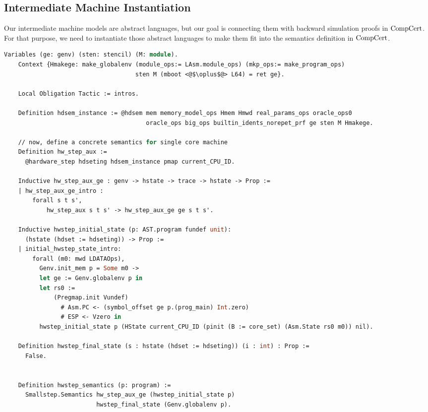 \clearpage
\subsection{Intermediate Machine Instantiation}
\label{chapter:certikos:subsec:intermediate-machine-instantiation}

Our intermediate machine models are abstract languages, but 
our goal is connecting them with backward simulation proofs in $\mathrm{CompCert}$. 
For that purpose, 
we need to instantiate those abstract languages to make them fit into 
the semantics definition in $\mathrm{CompCert}$.


\begin{lstlisting}[language=Caml]
    Variables (ge: genv) (sten: stencil) (M: module).
    Context {Hmakege: make_globalenv (module_ops:= LAsm.module_ops) (mkp_ops:= make_program_ops) 
                                     sten M (mboot <@$\oplus$@> L64) = ret ge}.
    
    Local Obligation Tactic := intros.
    
    Definition hdsem_instance := @hdsem mem memory_model_ops Hmem Hmwd real_params_ops oracle_ops0
                                        oracle_ops big_ops builtin_idents_norepet_prf ge sten M Hmakege.
    
    // now, define a concrete semantics for single core machine
    Definition hw_step_aux :=
      @hardware_step hdseting hdsem_instance pmap current_CPU_ID.
      
    Inductive hw_step_aux_ge : genv -> hstate -> trace -> hstate -> Prop :=
    | hw_step_aux_ge_intro : 
        forall s t s',
            hw_step_aux s t s' -> hw_step_aux_ge ge s t s'.
    
    Inductive hwstep_initial_state (p: AST.program fundef unit): 
      (hstate (hdset := hdseting)) -> Prop := 
    | initial_hwstep_state_intro: 
        forall (m0: mwd LDATAOps),
          Genv.init_mem p = Some m0 ->
          let ge := Genv.globalenv p in
          let rs0 :=
              (Pregmap.init Vundef)
                # Asm.PC <- (symbol_offset ge p.(prog_main) Int.zero)
                # ESP <- Vzero in
          hwstep_initial_state p (HState current_CPU_ID (pinit (B := core_set) (Asm.State rs0 m0)) nil).

    Definition hwstep_final_state (s : hstate (hdset := hdseting)) (i : int) : Prop :=
      False.
      
         
    Definition hwstep_semantics (p: program) :=
      Smallstep.Semantics hw_step_aux_ge (hwstep_initial_state p) 
                          hwstep_final_state (Genv.globalenv p).
    
\end{lstlisting}


